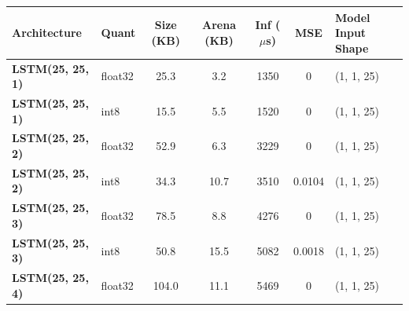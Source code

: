 \begin{tabular}{llccccl}
\toprule
\textbf{Architecture} & Quant & Size (KB) & Arena (KB) & Inf ($\mu$s) & MSE & Model Input Shape \\
\midrule
\textbf{LSTM(25, 25, 1)} & float32 & 25.3 & 3.2 & 1350 & 0 & (1, 1, 25) \\
\textbf{LSTM(25, 25, 1)} & int8 & 15.5 & 5.5 & 1520 & 0 & (1, 1, 25) \\
\textbf{LSTM(25, 25, 2)} & float32 & 52.9 & 6.3 & 3229 & 0 & (1, 1, 25) \\
\textbf{LSTM(25, 25, 2)} & int8 & 34.3 & 10.7 & 3510 & 0.0104 & (1, 1, 25) \\
\textbf{LSTM(25, 25, 3)} & float32 & 78.5 & 8.8 & 4276 & 0 & (1, 1, 25) \\
\textbf{LSTM(25, 25, 3)} & int8 & 50.8 & 15.5 & 5082 & 0.0018 & (1, 1, 25) \\
\textbf{LSTM(25, 25, 4)} & float32 & 104.0 & 11.1 & 5469 & 0 & (1, 1, 25) \\
\bottomrule
\end{tabular}